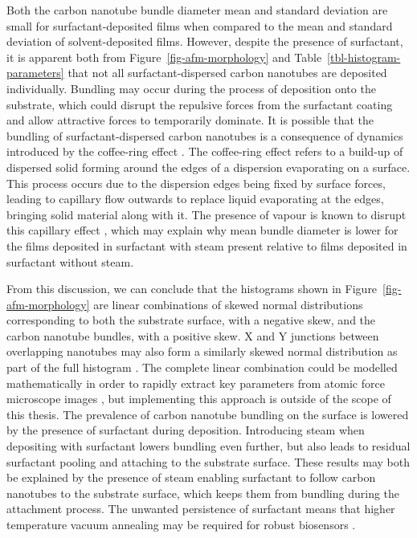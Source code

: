 \documentclass[
  a4paper,
]{scrbook}
\begin{document}
Both the carbon nanotube bundle diameter mean and standard deviation are
small for surfactant-deposited films when compared to the mean and
standard deviation of solvent-deposited films. However, despite the
presence of surfactant, it is apparent both from
Figure~\ref{fig-afm-morphology} and Table~\ref{tbl-histogram-parameters}
that not all surfactant-dispersed carbon nanotubes are deposited
individually. Bundling may occur during the process of deposition onto
the substrate, which could disrupt the repulsive forces from the
surfactant coating and allow attractive forces to temporarily dominate.
It is possible that the bundling of surfactant-dispersed carbon
nanotubes is a consequence of dynamics introduced by the coffee-ring
effect \autocite{Deegan1997,VanGaalen2021}. The coffee-ring effect
refers to a build-up of dispersed solid forming around the edges of a
dispersion evaporating on a surface. This process occurs due to the
dispersion edges being fixed by surface forces, leading to capillary
flow outwards to replace liquid evaporating at the edges, bringing solid
material along with it. The presence of vapour is known to disrupt this
capillary effect \autocite{Bishop2020}, which may explain why mean
bundle diameter is lower for the films deposited in surfactant with
steam present relative to films deposited in surfactant without steam.

From this discussion, we can conclude that the histograms shown in
Figure~\ref{fig-afm-morphology} are linear combinations of skewed normal
distributions corresponding to both the substrate surface, with a
negative skew, and the carbon nanotube bundles, with a positive skew. X
and Y junctions between overlapping nanotubes may also form a similarly
skewed normal distribution as part of the full histogram
\autocite{Murugathas2018}. The complete linear combination could be
modelled mathematically in order to rapidly extract key parameters from
atomic force microscope images \autocite{Marchenko2010}, but
implementing this approach is outside of the scope of this thesis. The
prevalence of carbon nanotube bundling on the surface is lowered by the
presence of surfactant during deposition. Introducing steam when
depositing with surfactant lowers bundling even further, but also leads
to residual surfactant pooling and attaching to the substrate surface.
These results may both be explained by the presence of steam enabling
surfactant to follow carbon nanotubes to the substrate surface, which
keeps them from bundling during the attachment process. The unwanted
persistence of surfactant means that higher temperature vacuum annealing
may be required for robust biosensors \autocite{Kane2014}.
\end{document}
